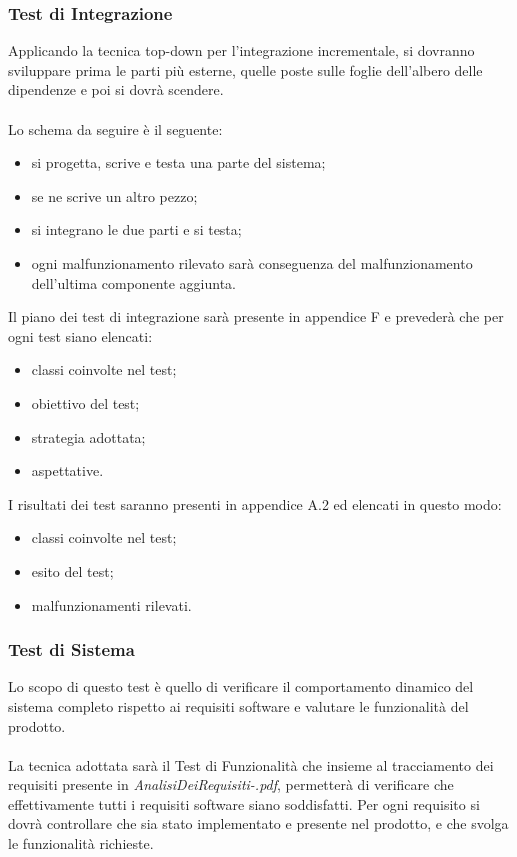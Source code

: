 \subsubsection*{Test di Integrazione} 
Applicando la tecnica top-down per
l'integrazione incrementale, si dovranno sviluppare prima le parti pi\`u
esterne, quelle poste sulle foglie dell'albero delle dipendenze e poi si dovr\`a
scendere.
\\\\
Lo schema da seguire \`e il seguente:
\begin{itemize}
  \item si progetta, scrive e testa una parte del sistema;
  \item se ne scrive un altro pezzo;
  \item si integrano le due parti e si testa;
  \item ogni malfunzionamento rilevato sar\`a conseguenza del malfunzionamento
  dell'ultima componente aggiunta.
\end{itemize}

Il piano dei test di integrazione sar\`a presente in appendice F e preveder\`a
che per ogni test siano elencati:
\begin{itemize}
  \item classi coinvolte nel test;
  \item obiettivo del test;
  \item strategia adottata;
  \item aspettative.
\end{itemize}

I risultati dei test saranno presenti in appendice A.2 ed elencati in
questo modo:
\begin{itemize}
  \item classi coinvolte nel test;
  \item esito del test;
  \item malfunzionamenti rilevati.
\end{itemize}

\subsubsection*{Test di Sistema}
Lo scopo di questo test \`e quello di verificare il comportamento dinamico del
sistema completo rispetto ai requisiti software e valutare le funzionalit\`a del
prodotto.
\\\\
La tecnica adottata sar\`a il Test di Funzionalit\`a che insieme al tracciamento
dei requisiti presente in \emph{AnalisiDeiRequisiti-\versioneAR.pdf},
permetter\`a di verificare che effettivamente tutti i requisiti software siano
soddisfatti. Per ogni requisito si dovr\`a controllare che sia stato
implementato e presente nel prodotto, e che svolga le funzionalit\`a richieste.


